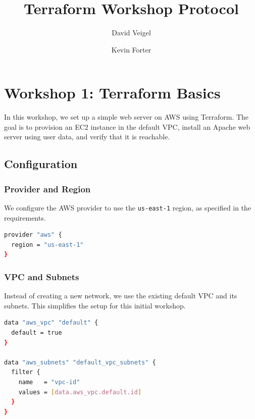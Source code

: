 \documentclass[BMR,Seminar,ngerman,IEEE]{twbook}
\title{Terraform Workshop Protocol}
\author{David Veigel \and Kevin Forter}
\begin{document}
\maketitle

\onecolumn
\newpage

\chapter{Workshop 1: Terraform Basics}
In this workshop, we set up a simple web server on AWS using Terraform. The goal is to provision an EC2 instance in the default VPC, install an Apache web server using user data, and verify that it is reachable.

\section{Configuration}

\subsection{Provider and Region}
We configure the AWS provider to use the \texttt{us-east-1} region, as specified in the requirements.
\begin{lstlisting}[language=bash]
provider "aws" {
  region = "us-east-1"
}
\end{lstlisting}

\subsection{VPC and Subnets}
Instead of creating a new network, we use the existing default VPC and its subnets. This simplifies the setup for this initial workshop.
\begin{lstlisting}[language=bash]
data "aws_vpc" "default" {
  default = true
}

data "aws_subnets" "default_vpc_subnets" {
  filter {
    name   = "vpc-id"
    values = [data.aws_vpc.default.id]
  }
}
\end{lstlisting}
\end{document}
